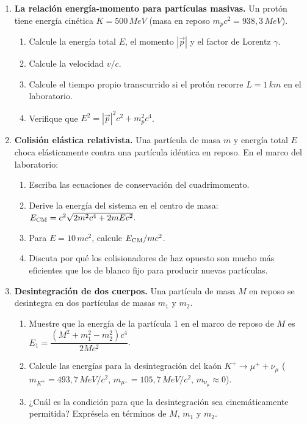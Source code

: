 \begin{enumerate}[leftmargin=2em, label=\textbf{P\thechapter.\arabic*.}]

  \item \textbf{La relación energía-momento para partículas masivas.}
  Un protón tiene energía cinética $K = 500\,\si{MeV}$ (masa en reposo $m_p c^2 = 938{,}3\,\si{MeV}$).
  \begin{enumerate}[label=(\alph*)]
    \item Calcule la energía total $E$, el momento $|\vec{p}|$ y el factor de Lorentz $\gamma$.
    \item Calcule la velocidad $v/c$.
    \item Calcule el tiempo propio transcurrido si el protón recorre $L = 1\,\si{km}$ en el laboratorio.
    \item Verifique que $E^2 = |\vec{p}|^2c^2 + m_p^2c^4$.
  \end{enumerate}

  \item \textbf{Colisión elástica relativista.}
  Una partícula de masa $m$ y energía total $E$ choca elásticamente contra una partícula idéntica en reposo. En el marco del laboratorio:
  \begin{enumerate}[label=(\alph*)]
    \item Escriba las ecuaciones de conservación del cuadrimomento.
    \item Derive la energía del sistema en el centro de masa: $E_{\rm CM} = c^2\sqrt{2m^2c^4 + 2mEc^2}$.
    \item Para $E = 10\,m c^2$, calcule $E_{\rm CM}/mc^2$.
    \item Discuta por qué los colisionadores de haz opuesto son mucho más eficientes que los de blanco fijo para producir nuevas partículas.
  \end{enumerate}

  \item \textbf{Desintegración de dos cuerpos.}
  Una partícula de masa $M$ en reposo se desintegra en dos partículas de masas $m_1$ y $m_2$.
  \begin{enumerate}[label=(\alph*)]
    \item Muestre que la energía de la partícula 1 en el marco de reposo de $M$ es
    $E_1 = \dfrac{(M^2 + m_1^2 - m_2^2)c^4}{2Mc^2}$.
    \item Calcule las energías para la desintegración del kaón $K^+ \to \mu^+ + \nu_\mu$
    ($m_{K^+} = 493{,}7\,\si{MeV}/c^2$, $m_{\mu^+} = 105{,}7\,\si{MeV}/c^2$, $m_{\nu_\mu} \approx 0$).
    \item ¿Cuál es la condición para que la desintegración sea cinemáticamente permitida? Exprésela en términos de $M$, $m_1$ y $m_2$.
  \end{enumerate}


\end{enumerate}
